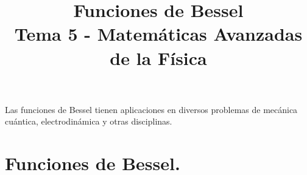 
\title{Funciones de Bessel \\ {\large Tema 5 - Matemáticas Avanzadas de la Física}\vspace{-1.5\baselineskip}}
\date{ }

\maketitle
\fontsize{14}{14}\selectfont
Las funciones de Bessel tienen aplicaciones en diversos problemas de mecánica cuántica, electrodinámica y otras disciplinas.
\section{Funciones de Bessel.}

